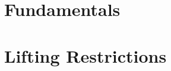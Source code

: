 \documentclass[11pt]{book}
\begin{document}
\setlength\emergencystretch{\hsize}



\thispagestyle{empty}

\thispagestyle{empty}



\tableofcontents


% 

\mainmatter




\part{Fundamentals}



% 




\part{Lifting Restrictions}





% 

% 

% 



% 

% 

% 

% 

% 

% 

% 



% 
\end{document}
